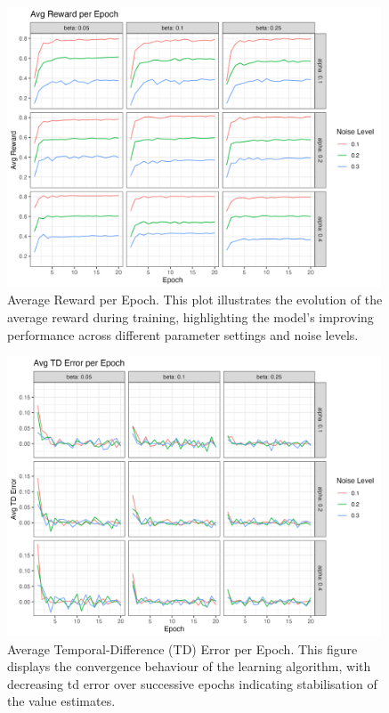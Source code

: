 \begin{figure}[h]
    \centering
    \includegraphics[width=0.99\textwidth]{../figures/epoch_reward.png}
    \caption{Average Reward per Epoch. This plot illustrates the evolution of the average reward during training, highlighting the model's improving performance across different parameter settings and noise levels.}
    \label{fig:epoch_reward}
\end{figure}

\begin{figure}[h]
    \centering
    \includegraphics[width=0.99\textwidth]{../figures/epoch_td.png}
    \caption{Average Temporal-Difference (TD) Error per Epoch. This figure displays the convergence behaviour of the learning algorithm, with decreasing \ac{td} error over successive epochs indicating stabilisation of the value estimates.}
    \label{fig:epoch_td}
\end{figure}

